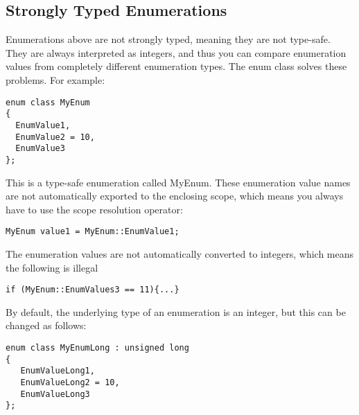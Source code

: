 \documentclass{article}
\begin{document}
\subsection{Strongly Typed Enumerations}
Enumerations above are not strongly typed, meaning they are not type-safe. They are always interpreted
as integers, and thus you can compare enumeration values from completely different enumeration types.
The enum class solves these problems. For example:
\begin{verbatim}
enum class MyEnum
{
  EnumValue1,
  EnumValue2 = 10,
  EnumValue3
};
\end{verbatim}
This is a type-safe enumeration called MyEnum. These enumeration value names are not automatically
exported to the enclosing scope, which means you always have to use the scope resolution operator:
\begin{verbatim}
MyEnum value1 = MyEnum::EnumValue1;
\end{verbatim}
The enumeration values are not automatically converted to integers, which means the following is illegal
\begin{verbatim}
if (MyEnum::EnumValues3 == 11){...}
\end{verbatim}
By default, the underlying type of an enumeration is an integer, but this can be changed as follows:
\begin{verbatim}
enum class MyEnumLong : unsigned long
{
   EnumValueLong1,
   EnumValueLong2 = 10,
   EnumValueLong3
};
\end{verbatim}
\end{document}
